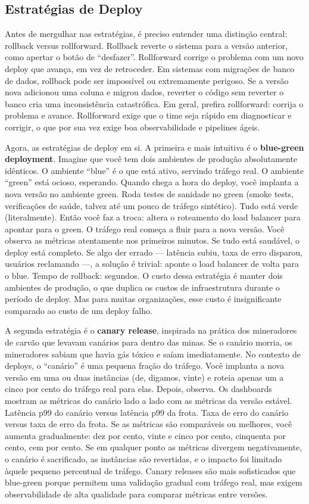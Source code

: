 \subsection{Estratégias de Deploy}

Antes de mergulhar nas estratégias, é preciso entender uma distinção central:
rollback versus rollforward. Rollback reverte o sistema para a versão anterior,
como apertar o botão de ``desfazer''. Rollforward corrige o problema com um novo
deploy que avança, em vez de retroceder. Em sistemas com migrações de banco de
dados, rollback pode ser impossível ou extremamente perigoso. Se a versão nova
adicionou uma coluna e migrou dados, reverter o código sem reverter o banco cria
uma inconsistência catastrófica. Em geral, prefira rollforward: corrija o problema
e avance. Rollforward exige que o time seja rápido em diagnosticar e corrigir, o
que por sua vez exige boa observabilidade e pipelines ágeis.

Agora, as estratégias de deploy em si. A primeira e mais intuitiva é o
\textbf{blue-green deployment}. Imagine que você tem dois ambientes de produção
absolutamente idênticos. O ambiente ``blue'' é o que está ativo, servindo tráfego
real. O ambiente ``green'' está ocioso, esperando. Quando chega a hora do deploy,
você implanta a nova versão no ambiente green. Roda testes de sanidade no green
(smoke tests, verificações de saúde, talvez até um pouco de tráfego sintético).
Tudo está verde (literalmente). Então você faz a troca: altera o roteamento do
load balancer para apontar para o green. O tráfego real começa a fluir para a
nova versão. Você observa as métricas atentamente nos primeiros minutos. Se tudo
está saudável, o deploy está completo. Se algo der errado --- latência subiu,
taxa de erro disparou, usuários reclamando ---, a solução é trivial: aponte o
load balancer de volta para o blue. Tempo de rollback: segundos. O custo dessa
estratégia é manter dois ambientes de produção, o que duplica os custos de
infraestrutura durante o período de deploy. Mas para muitas organizações, esse
custo é insignificante comparado ao custo de um deploy falho.

A segunda estratégia é o \textbf{canary release}, inspirada na prática dos
mineradores de carvão que levavam canários para dentro das minas. Se o canário
morria, os mineradores sabiam que havia gás tóxico e saíam imediatamente. No
contexto de deploys, o ``canário'' é uma pequena fração do tráfego. Você implanta
a nova versão em uma ou duas instâncias (de, digamos, vinte) e roteia apenas
um a cinco por cento do tráfego real para elas. Depois, observa. Os dashboards
mostram as métricas do canário lado a lado com as métricas da versão estável.
Latência p99 do canário versus latência p99 da frota. Taxa de erro do canário
versus taxa de erro da frota. Se as métricas são comparáveis ou melhores, você
aumenta gradualmente: dez por cento, vinte e cinco por cento, cinquenta por
cento, cem por cento. Se em qualquer ponto as métricas divergem negativamente,
o canário é sacrificado, as instâncias são revertidas, e o impacto foi
limitado àquele pequeno percentual de tráfego. Canary releases são mais
sofisticados que blue-green porque permitem uma validação gradual com tráfego
real, mas exigem observabilidade de alta qualidade para comparar métricas entre
versões.

